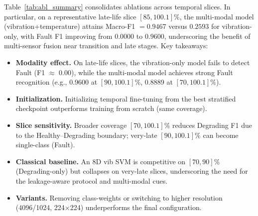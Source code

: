\documentclass[pdflatex,sn-mathphys-num]{sn-jnl}%
\begin{document}
Table~\ref{tab:abl_summary} consolidates ablations across temporal slices. In particular, on a representative late-life slice $[85,100.1]\%$, the multi-modal model (vibration+temperature) attains Macro-F1 $=0.9467$ versus $0.2593$ for vibration-only, with Fault F1 improving from $0.0000$ to $0.9600$, underscoring the benefit of multi-sensor fusion near transition and late stages. Key takeaways:
\begin{itemize}
  \item \textbf{Modality effect.} On late-life slices, the vibration-only model fails to detect Fault (F1 $\approx$ 0.00), while the multi-modal model achieves strong Fault recognition (e.g., 0.9600 at $[90,100.1]\%$, 0.8889 at $[70,100.1]\%$).
  \item \textbf{Initialization.} Initializing temporal fine-tuning from the best stratified checkpoint outperforms training from scratch (same coverage).
  \item \textbf{Slice sensitivity.} Broader coverage $[70,100.1]\%$ reduces Degrading F1 due to the Healthy--Degrading boundary; very-late $[90,100.1]\%$ can become single-class (Fault).
  \item \textbf{Classical baseline.} An 8D vib SVM is competitive on $[70,90]\%$ (Degrading-only) but collapses on very-late slices, underscoring the need for the leakage-aware protocol and multi-modal cues.
  \item \textbf{Variants.} Removing class-weights or switching to higher resolution (4096/1024, 224$\times$224) underperforms the final configuration.
\end{itemize}
\end{document}
